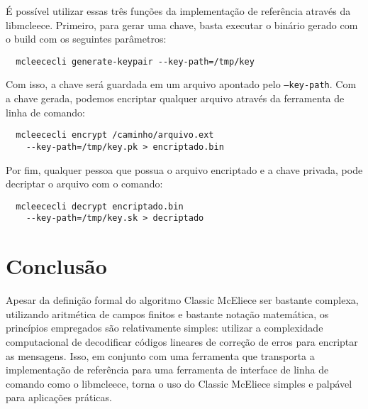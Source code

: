 É possível utilizar essas três funções da implementação de referência através da libmcleece. Primeiro, para gerar uma chave, basta executar o binário gerado com o build com os seguintes parâmetros:

\begin{verbatim}
  mcleececli generate-keypair --key-path=/tmp/key
\end{verbatim}

Com isso, a chave será guardada em um arquivo apontado pelo \texttt{--key-path}. Com a chave gerada, podemos encriptar qualquer arquivo através da ferramenta de linha de comando:

\begin{verbatim}
  mcleececli encrypt /caminho/arquivo.ext 
    --key-path=/tmp/key.pk > encriptado.bin
\end{verbatim}

Por fim, qualquer pessoa que possua o arquivo encriptado e a chave privada, pode decriptar o arquivo com o comando:

\begin{verbatim}
  mcleececli decrypt encriptado.bin 
    --key-path=/tmp/key.sk > decriptado
\end{verbatim}

\section{Conclusão}

Apesar da definição formal do algoritmo Classic McEliece ser bastante complexa, utilizando aritmética de campos finitos e bastante notação matemática, os princípios empregados são relativamente simples: utilizar a complexidade computacional de decodificar códigos lineares de correção de erros para encriptar as mensagens. Isso, em conjunto com uma ferramenta que transporta a implementação de referência para uma ferramenta de interface de linha de comando como o libmcleece, torna o uso do Classic McEliece simples e palpável para aplicações práticas.